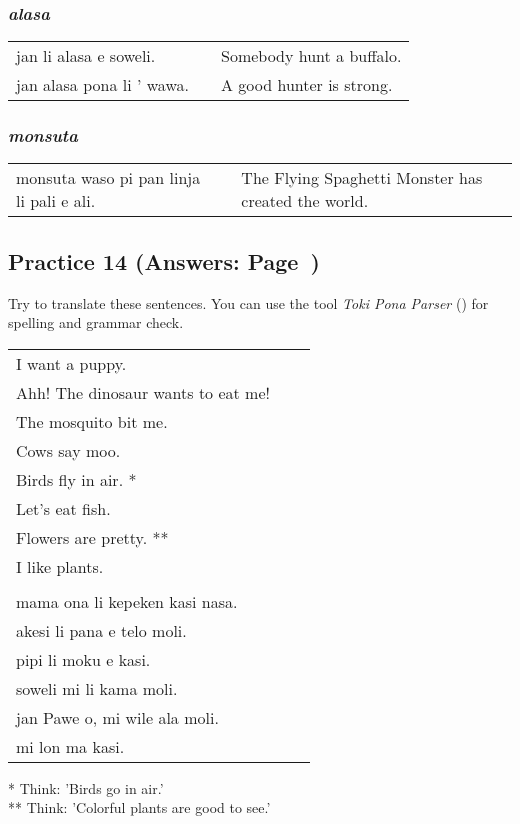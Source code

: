 \subsubsection*{\textit{alasa}}
\begin{supertabular}{p{5,5cm}|ll}
jan li alasa e soweli. && Somebody hunt a buffalo. \\
jan alasa pona li ' wawa. && A good hunter is strong. \\
\end{supertabular}

\subsubsection*{\textit{monsuta}}
\begin{supertabular}{p{5,5cm}|ll}
monsuta waso pi pan linja li pali e ali. &&  The Flying Spaghetti Monster has created the world. \\
\end{supertabular}

\subsection*{Practice 14 (Answers: Page~\pageref{'living_things'})}
%
Try to translate these sentences. 
You can use the tool \textit{Toki Pona Parser} (\cite{www:rowa:02}) for spelling and grammar check. 

\begin{supertabular}{p{5,5cm}|ll}
I want a puppy. &&   \\ %
Ahh! The dinosaur wants to eat me!  &&  \\ %
The mosquito bit me.  &&  \\ %
Cows say moo.  &&  \\ %
Birds fly in air. * &&  \\ %
Let's eat fish.  &&  \\ %
Flowers are pretty. ** &&  \\ %
I like plants. &&   \\ %
 && \\ %
mama ona li kepeken kasi nasa.  &&  \\ %
akesi li pana e telo moli. &&  \\  %
pipi li moku e kasi.  &&  \\ %
soweli mi li kama moli.  &&  \\ %
jan Pawe o, mi wile ala moli. && \\   %
mi lon ma kasi. &&   \\ %
\end{supertabular} 

* Think: 'Birds go in air.' \\
** Think: 'Colorful plants are good to see.' 
